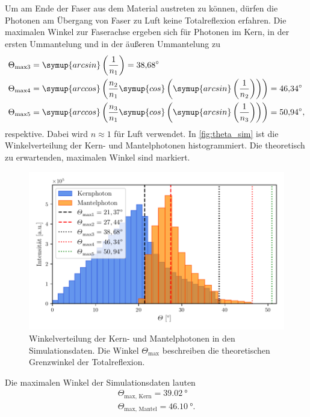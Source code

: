Um am Ende der Faser aus dem Material austreten zu können, dürfen die Photonen am Übergang von Faser zu Luft keine Totalreflexion erfahren. 
Die maximalen Winkel zur Faserachse ergeben sich für Photonen im Kern, in der ersten Ummantelung und in der äußeren Ummantelung zu 
\begin{align*}
  \Theta_\text{max3} &= \symup{arcsin}\left(\frac{1}{n_1}\right) = \qty{38.68}{\degree} \\
  \Theta_\text{max4} &= \symup{arccos}\left(\frac{n_2}{n_1}\symup{cos}\left(\symup{arcsin}\left(\frac{1}{n_2}\right)\right)\right) = \qty{46.34}{\degree} \\
  \Theta_\text{max5} &= \symup{arccos}\left(\frac{n_3}{n_1}\symup{cos}\left(\symup{arcsin}\left(\frac{1}{n_3}\right)\right)\right) = \qty{50.94}{\degree}, \\
\end{align*}
respektive. Dabei wird $n \approx 1$ für Luft verwendet.
In \autoref{fig:theta_sim} ist die Winkelverteilung der Kern- und Mantelphotonen histogrammiert. Die theoretisch zu erwartenden, maximalen Winkel sind markiert.
\begin{figure}
  \centering
  \includegraphics[width = .8\textwidth]{content/pics/theta_sim.pdf}
  \caption{Winkelverteilung der Kern- und Mantelphotonen in den Simulationsdaten. Die Winkel $\Theta_\text{max}$ beschreiben die theoretischen Grenzwinkel der Totalreflexion.}
  \label{fig:theta_sim}
\end{figure}
Die maximalen Winkel der Simulationsdaten lauten 
\begin{align*}
  \Theta_\text{max, Kern} = \qty{39.02}{\degree} \\
  \Theta_\text{max, Mantel} = \qty{46.10}{\degree}.
\end{align*}

